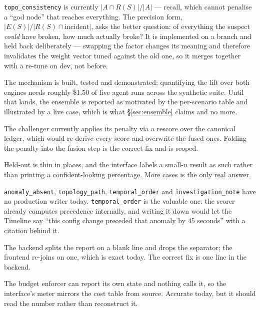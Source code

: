 \documentclass[11pt,a4paper]{article}
\newcommand{\code}[1]{\texttt{\small #1}}
\begin{document}
\begin{description}[leftmargin=1.4em, style=nextline]

  \item[Sharpen the topology factor from recall to precision.]
  \code{topo\_consistency} is currently $|A \cap R(S)| / |A|$ --- recall, which
  cannot penalise a ``god node'' that reaches everything. The precision form,
  $|E(S)| / |R(S) \cap \text{incident}|$, asks the better question: of everything
  the suspect \emph{could} have broken, how much actually broke? It is
  implemented on a branch and held back deliberately --- swapping the factor
  changes its meaning and therefore invalidates the weight vector tuned against
  the old one, so it merges together with a re-tune on dev, not before.

  \item[Establish the ensemble's rate across the full suite.] The mechanism is
  built, tested and demonstrated; quantifying the lift over both engines needs
  roughly \$1.50 of live agent runs across the synthetic suite. Until that lands,
  the ensemble is reported as motivated by the per-scenario table and illustrated
  by a live case, which is what \S\ref{sec:ensemble} claims and no more.

  \item[Fold the challenger's penalty into fusion.] The challenger currently
  applies its penalty via a rescore over the canonical ledger, which would
  re-derive every score and overwrite the fused ones. Folding the penalty into
  the fusion step is the correct fix and is scoped.

  \item[Grow the held-out suite.] Held-out is thin in places, and the interface
  labels a small-$n$ result as such rather than printing a confident-looking
  percentage. More cases is the only real answer.

  \item[Write the four remaining ledger fact kinds.] \code{anomaly\_absent},
  \code{topology\_path}, \code{temporal\_order} and \code{investigation\_note}
  have no production writer today. \code{temporal\_order} is the valuable one:
  the scorer already computes precedence internally, and writing it down would
  let the Timeline say ``this config change preceded that anomaly by 45 seconds''
  with a citation behind it.

  \item[Emit the separator when chunking narration.] The backend splits the
  report on a blank line and drops the separator; the frontend re-joins on one,
  which is exact today. The correct fix is one line in the backend.

  \item[Serve the budget limits.] The budget enforcer can report its own state
  and nothing calls it, so the interface's meter mirrors the cost table from
  source. Accurate today, but it should read the number rather than reconstruct
  it.

\end{description}
\end{document}

